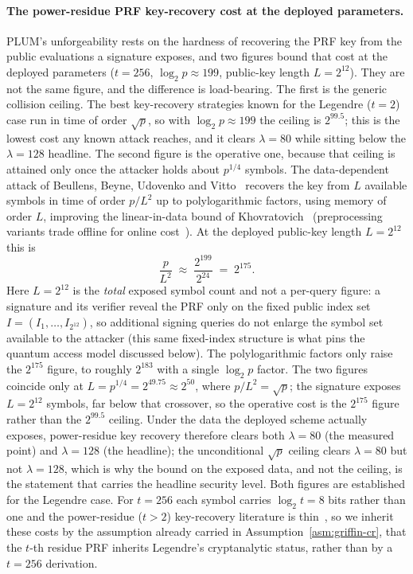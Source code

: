 \paragraph{The power-residue PRF key-recovery cost at the deployed parameters.}
PLUM's unforgeability rests on the hardness of recovering the PRF key from the public evaluations a signature exposes, and two figures bound that cost at the deployed parameters ($t=256$, $\log_2 p\approx199$, public-key length $L=2^{12}$). They are not the same figure, and the difference is load-bearing. The first is the generic collision ceiling. The best key-recovery strategies known for the Legendre ($t{=}2$) case run in time of order $\sqrt p$, so with $\log_2 p\approx199$ the ceiling is $2^{99.5}$; this is the lowest cost any known attack reaches, and it clears $\lambda=80$ while sitting below the $\lambda=128$ headline. The second figure is the operative one, because that ceiling is attained only once the attacker holds about $p^{1/4}$ symbols. The data-dependent attack of Beullens, Beyne, Udovenko and Vitto~\cite{beullensbeyne2020} recovers the key from $L$ available symbols in time of order $p/L^2$ up to polylogarithmic factors, using memory of order $L$, improving the linear-in-data bound of Khovratovich~\cite{khovratovich2019legendre} (preprocessing variants trade offline for online cost~\cite{may2022legendre}). At the deployed public-key length $L=2^{12}$ this is
\begin{equation*}
  \frac{p}{L^2}\;\approx\;\frac{2^{199}}{2^{24}}\;=\;2^{175}.
\end{equation*}
Here $L=2^{12}$ is the \emph{total} exposed symbol count and not a per-query figure: a signature and its verifier reveal the PRF only on the fixed public index set $I=(I_1,\dots,I_{2^{12}})$, so additional signing queries do not enlarge the symbol set available to the attacker (this same fixed-index structure is what pins the quantum access model discussed below). The polylogarithmic factors only raise the $2^{175}$ figure, to roughly $2^{183}$ with a single $\log_2 p$ factor. The two figures coincide only at $L=p^{1/4}=2^{49.75} \approx2^{50}$, where $p/L^2=\sqrt p$; the signature exposes $L=2^{12}$ symbols, far below that crossover, so the operative cost is the $2^{175}$ figure rather than the $2^{99.5}$ ceiling. Under the data the deployed scheme actually exposes, power-residue key recovery therefore clears both $\lambda=80$ (the measured point) and $\lambda=128$ (the headline); the unconditional $\sqrt p$ ceiling clears $\lambda=80$ but not $\lambda=128$, which is why the bound on the exposed data, and not the ceiling, is the statement that carries the headline security level. Both figures are established for the Legendre case. For $t=256$ each symbol carries $\log_2 t=8$ bits rather than one and the power-residue ($t>2$) key-recovery literature is thin~\cite{beullensbeyne2020}, so we inherit these costs by the assumption already carried in Assumption~\ref{asm:griffin-cr}, that the $t$-th residue PRF inherits Legendre's cryptanalytic status, rather than by a $t=256$ derivation.

